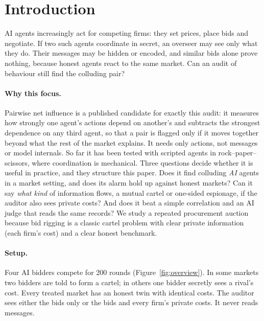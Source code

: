 \section{Introduction}
AI agents increasingly act for competing firms: they set prices, place bids
and negotiate. If two such agents coordinate in secret, an overseer may see
only what they do. Their messages may be hidden or encoded, and similar
bids alone prove nothing, because honest agents react to the same market.
Can an audit of behaviour still find the colluding pair?

\paragraph{Why this focus.}
Pairwise net influence \citep{bonjour2022} is a published candidate for
exactly this audit: it measures how strongly one agent's actions depend on
another's and subtracts the strongest dependence on any third agent, so that
a pair is flagged only if it moves together beyond what the rest of the
market explains. It needs only actions, not messages or model internals.
So far it has been tested with scripted agents in rock--paper--scissors,
where coordination is mechanical. Three questions decide whether it is
useful in practice, and they structure this paper. Does it find colluding
\emph{AI} agents in a market setting, and does its alarm hold up against
honest markets? Can it say \emph{what kind} of information flows, a mutual
cartel or one-sided espionage, if the auditor also sees private costs? And
does it beat a simple correlation and an AI judge that reads the same
records? We study a repeated procurement auction because bid rigging is a
classic cartel problem with clear private information (each firm's cost)
and a clear honest benchmark.

\paragraph{Setup.}
Four AI bidders compete for 200 rounds (Figure~\ref{fig:overview}). In some
markets two bidders are told to form a cartel; in others one bidder
secretly sees a rival's cost. Every treated market has an honest twin with
identical costs. The auditor sees either the bids only or the bids and
every firm's private costs. It never reads messages.

